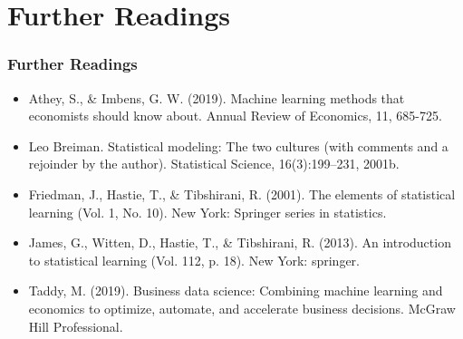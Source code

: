 \documentclass[
  shownotes,
  xcolor={svgnames},
  hyperref={colorlinks,citecolor=DarkBlue,linkcolor=DarkRed,urlcolor=DarkBlue}
  ]{beamer}
\begin{document}
\section{Further Readings}
\begin{frame}
\frametitle{Further Readings}

\begin{itemize}
\scriptsize
  \item Athey, S., \& Imbens, G. W. (2019). Machine learning methods that economists should know about. Annual Review of Economics, 11, 685-725.
  \medskip
  \item Leo Breiman. Statistical modeling: The two cultures (with comments and a rejoinder by the author). Statistical Science, 16(3):199–231, 2001b.
  \medskip
  \item Friedman, J., Hastie, T., \& Tibshirani, R. (2001). The elements of statistical learning (Vol. 1, No. 10). New York: Springer series in statistics.
  \medskip
  \item James, G., Witten, D., Hastie, T., \& Tibshirani, R. (2013). An introduction to statistical learning (Vol. 112, p. 18). New York: springer.
  \medskip
  \item Taddy, M. (2019). Business data science: Combining machine learning and economics to optimize, automate, and accelerate business decisions. McGraw Hill Professional.
  
  
\end{itemize}

\end{frame}

\end{document}
